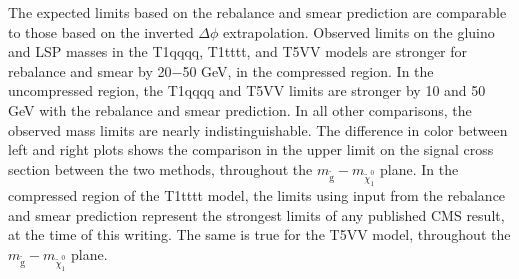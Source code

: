 The expected limits based on the rebalance and smear prediction are comparable to those based on the inverted $\Delta\phi$ extrapolation.  Observed limits on the gluino and LSP masses in the T1qqqq, T1tttt, and T5VV models are stronger for rebalance and smear by 20$-$50 GeV, in the compressed region. In the uncompressed region, the T1qqqq and T5VV limits are stronger by 10 and 50 GeV with the rebalance and smear prediction. In all other comparisons, the observed mass limits are nearly indistinguishable. The difference in color between left and right plots shows the comparison in the upper limit on the signal cross section between the two methods, throughout the $m_{\tilde{\text{g}}}-m_{\tilde{\chi}_{1}^{0}}$ plane. In the compressed region of the T1tttt model, the limits using input from the rebalance and smear prediction represent the strongest limits of any published CMS result, at the time of this writing. The same is true for the T5VV model, throughout the $m_{\tilde{\text{g}}}-m_{\tilde{\chi}_{1}^{0}}$ plane.

